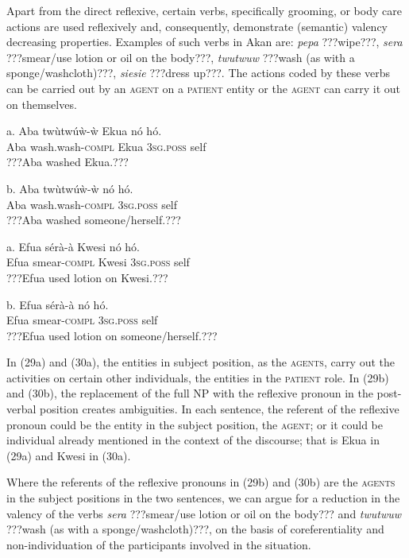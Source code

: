 \documentclass[output=paper]{langsci/langscibook}
\begin{document}
Apart from the direct reflexive, certain verbs, specifically grooming, or body care actions \citep{Kemmer1993} are used reflexively and, consequently, demonstrate (semantic) valency decreasing properties. Examples of such verbs in Akan are: \emph{pepa} ???wipe???, \emph{sera} ???smear/use lotion or oil on the body???, \emph{twutwuw} ???wash (as with a sponge/washcloth)???, \emph{siesie} ???dress up???. The actions coded by these verbs can be carried out by an \textsc{agent} on a \textsc{patient} entity or the \textsc{agent} can carry it out on themselves. 

\ea
\gll a.  Aba  tw\`{u}twúẁ-ẁ    Ekua  nó    hó.\\
       Aba  wash.wash-\textsc{compl}  Ekua  \textsc{3sg.poss}  self\\
\glt   ???Aba washed Ekua.???
\z

\ea
\gll  b.  Aba  tw\`{u}twúẁ-ẁ    nó    hó.\\
       Aba  wash.wash-\textsc{compl}  \textsc{3sg.poss}  self\\
\glt   ???Aba washed someone/herself.???
\z

\ea
\gll a.  Efua  sérà-à    Kwesi    nó    hó.\\
       Efua  smear-\textsc{compl}  Kwesi    \textsc{3sg.poss}  self\\
\glt   ???Efua used lotion on Kwesi.???
\z

\ea
\gll  b.  Efua  sérà-à    nó    hó.\\
       Efua  smear-\textsc{compl}  \textsc{3sg.poss}  self\\
\glt   ???Efua used lotion on someone/herself.???
\z

In (29a) and (30a), the entities in subject position, as the \textsc{agents}, carry out the activities on certain other individuals, the entities in the \textsc{patient} role. In (29b) and (30b), the replacement of the full NP with the reflexive pronoun in the post-verbal position creates ambiguities. In each sentence, the referent of the reflexive pronoun could be the entity in the subject position, the \textsc{agent}; or it could be individual already mentioned in the context of the discourse; that is Ekua in (29a) and Kwesi in (30a).

Where the referents of the reflexive pronouns in (29b) and (30b) are the \textsc{agents} in the subject positions in the two sentences, we can argue for a reduction in the valency of the verbs \emph{sera} ???smear/use lotion or oil on the body??? and \emph{twutwuw} ???wash (as with a sponge/washcloth)???, on the basis of coreferentiality and non-individuation of the participants involved in the situation. 
\end{document}
